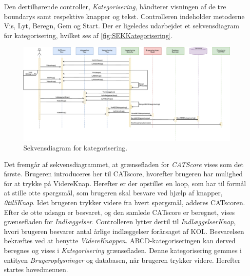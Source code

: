 Den dertilhørende controller, \textit{Kategorisering}, håndterer visningen af de tre boundarys samt respektive knapper og tekst. Controlleren indeholder metoderne Vis, Lyt, Beregn, Gem og Start. 
Der er ligeledes udarbejdet et sekvensdiagram for kategorisering, hvilket ses af \autoref{fig:SEKKategorisering}.

\begin{figure} [H]
\centering
\includegraphics[width=1.55\textwidth, angle=90]{figures/Sek/SEKKategorisering}
\caption{Sekvensdiagram for kategorisering.}
\label{fig:SEKKategorisering}
\end{figure}

\noindent
Det fremgår af sekvensdiagrammet, at grænsefladen for \textit{CATScore} vises som det første. Brugeren introduceres her til CATscore, hvorefter brugeren har mulighed for at trykke på VidereKnap. Herefter er der opstillet en loop, som har til formål at stille otte spørgsmål, som brugeren skal besvare ved hjælp af knapper, \textit{0til5Knap}. Idet brugeren trykker videre fra hvert spørgsmål, adderes CATscoren. Efter de otte udsagn er besvaret, og den samlede CATscore er beregnet, vises grænsefladen for \textit{Indlæggelser}. Controlleren lytter dertil til \textit{IndlæggelserKnap}, hvori brugeren besvarer antal årlige indlæggelser forårsaget af KOL. Besvarelsen bekræftes ved at benytte \textit{VidereKnappen}. ABCD-kategoriseringen kan derved beregnes og vises i \textit{Kategorisering} grænsefladen. Denne kategorisering gemmes i entityen \textit{Brugeroplysninger} og databasen, når brugeren trykker videre. Herefter startes hovedmenuen.

